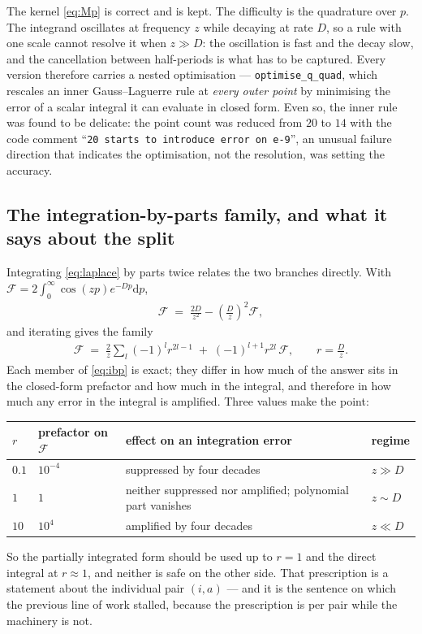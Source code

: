 \documentclass[11pt]{article}
\newcommand{\parth}[1]{\left(#1\right)}
\newcommand{\code}[1]{\texttt{\small #1}}
\begin{document}
The kernel \eqref{eq:Mp} is correct and is kept. The difficulty is the quadrature over $p$.
The integrand oscillates at frequency $z$ while decaying at rate $D$, so a rule with one
scale cannot resolve it when $z \gg D$: the oscillation is fast and the decay slow, and the
cancellation between half-periods is what has to be captured. Every version therefore
carries a nested optimisation --- \code{optimise\_q\_quad}, which rescales an inner
Gauss--Laguerre rule at \emph{every outer point} by minimising the error of a scalar
integral it can evaluate in closed form. Even so, the inner rule was found to be delicate:
the point count was reduced from $20$ to $14$ with the code comment ``\code{20 starts to
introduce error on e-9}'', an unusual failure direction that indicates the optimisation, not
the resolution, was setting the accuracy.

\subsection{The integration-by-parts family, and what it says about the split}

Integrating \eqref{eq:laplace} by parts twice relates the two branches directly. With
$\mathcal{F} = 2\int_0^\infty \cos(zp) e^{-Dp}\mathrm{d}p$,
\begin{align}
    \mathcal{F} \;=\; \frac{2D}{z^2} - \parth{\frac{D}{z}}^2 \mathcal{F} ,
\end{align}
and iterating gives the family
\begin{align}
    \mathcal{F} \;=\; \frac{2}{z}\sum_{l} (-1)^l r^{2l-1} \;+\; (-1)^{l+1} r^{2l}\,\mathcal{F} ,
    \qquad r = \frac{D}{z} .
    \label{eq:ibp}
\end{align}
Each member of \eqref{eq:ibp} is exact; they differ in how much of the answer sits in the
closed-form prefactor and how much in the integral, and therefore in how much any error in
the integral is amplified. Three values make the point:
\begin{center}
\begin{tabular}{llll}
\toprule
$r$ & prefactor on $\mathcal{F}$ & effect on an integration error & regime \\
\midrule
$0.1$ & $10^{-4}$ & suppressed by four decades & $z \gg D$ \\
$1$   & $1$       & neither suppressed nor amplified; polynomial part vanishes & $z \sim D$ \\
$10$  & $10^{4}$  & amplified by four decades & $z \ll D$ \\
\bottomrule
\end{tabular}
\end{center}
So the partially integrated form should be used up to $r = 1$ and the direct integral at
$r \approx 1$, and neither is safe on the other side. That prescription is a statement about
the individual pair $(i,a)$ --- and it is the sentence on which the previous line of work
stalled, because the prescription is per pair while the machinery is not.
\end{document}
